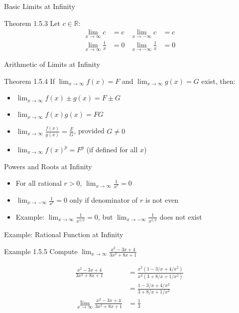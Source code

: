 \documentclass[aspectratio=169]{beamer}
\newcommand{\limx}[2]{\lim_{x \to #1} #2}
\begin{document}
\begin{frame}{Basic Limits at Infinity}
\begin{block}{Theorem 1.5.3}
Let $c \in \mathbb{R}$:
\begin{align*}
  \limx{\infty}{c} &= c & \lim_{x \to -\infty} c &= c \\
  \limx{\infty}{\frac{1}{x}} &= 0 & \lim_{x \to -\infty} \frac{1}{x} &= 0
\end{align*}
\end{block}
\end{frame}

\begin{frame}{Arithmetic of Limits at Infinity}
\begin{block}{Theorem 1.5.4}
If $\limx{\infty}{f(x)} = F$ and $\limx{\infty}{g(x)} = G$ exist, then:
\begin{itemize}
  \item $\limx{\infty}{f(x) \pm g(x)} = F \pm G$
  \item $\limx{\infty}{f(x)g(x)} = FG$
  \item $\limx{\infty}{\frac{f(x)}{g(x)}} = \frac{F}{G}$, provided $G \neq 0$
  \item $\limx{\infty}{f(x)^p} = F^p$ (if defined for all $x$)
\end{itemize}
\end{block}
\end{frame}

\begin{frame}{Powers and Roots at Infinity}
\begin{itemize}
  \item For all rational $r > 0$, $\limx{\infty}{\frac{1}{x^r}} = 0$
  \item $\lim_{x \to -\infty} \frac{1}{x^r} = 0$ only if denominator of $r$ is not even
  \item Example: $\limx{\infty}{\frac{1}{x^{1/2}}} = 0$, but $\lim_{x \to -\infty} \frac{1}{x^{1/2}}$ does not exist
\end{itemize}
\end{frame}

\begin{frame}{Example: Rational Function at Infinity}
\begin{block}{Example 1.5.5}
Compute $\limx{\infty}{\frac{x^2-3x+4}{3x^2+8x+1}}$
\end{block}
\begin{align*}
\frac{x^2-3x+4}{3x^2+8x+1} &= \frac{x^2(1-3/x+4/x^2)}{x^2(3+8/x+1/x^2)} \\
&= \frac{1-3/x+4/x^2}{3+8/x+1/x^2} \\
\limx{\infty}{\frac{x^2-3x+4}{3x^2+8x+1}} &= \frac{1}{3}
\end{align*}
\end{frame}
\end{document}
